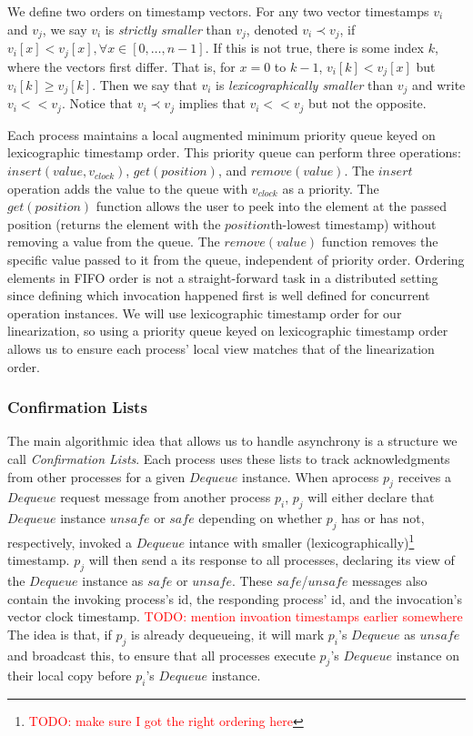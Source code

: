 \documentclass[a4paper,USenglish]{lipics-v2021} %
\begin{document}
We define two orders on timestamp vectors.  For any two vector timestamps $v_i$ and $v_j$, we say $v_i$ is \emph{strictly smaller} than $v_j$, denoted $v_i \prec  v_j$, if $v_i[x] < v_j[x],\forall x \in [0, \dots, n-1]$.  If this is not true, there is some index $k$, where the vectors first differ.  That is, for $x = 0$ to $k-1$, $v_i[k] < v_j[x]$ but $v_i[k] \geq v_j [k]$.  Then we say that $v_i$ is \emph{lexicographically smaller} than $v_j$ and write $v_i << v_j$.  Notice that $v_i \prec v_j$ implies that $v_i << v_j$ but not the opposite.

Each process maintains a local augmented minimum priority queue keyed on lexicographic timestamp order.  This priority queue can perform three operations: $insert(value, v_{clock})$, $get(position)$, and $remove(value)$.  The $insert$ operation adds the value to the queue with $v_{clock}$ as a priority.  The $get(position)$ function allows the user to peek into the element at the passed position (returns the element with the $position$th-lowest timestamp) without removing a value from the queue.  The $remove(value)$ function removes the specific value passed to it from the queue, independent of priority order.  Ordering elements in FIFO order is not a straight-forward task in a distributed setting since defining which invocation happened first is well defined for concurrent operation instances.  We will use lexicographic timestamp order for our linearization, so using a priority queue keyed on lexicographic timestamp order allows us to ensure each process' local view matches that of the linearization order.

\subsubsection{Confirmation Lists}
The main algorithmic idea that allows us to handle asynchrony is a structure we call \emph{Confirmation Lists}.  Each process uses these lists to track acknowledgments from other processes for a given $Dequeue$ instance.  When aprocess $p_j$ receives a $Dequeue$ request message from another process $p_i$, $p_j$ will either declare that $Dequeue$ instance $unsafe$ or $safe$ depending on whether $p_j$ has or has not, respectively, invoked a $Dequeue$ intance with smaller (lexicographically)\footnote{\textcolor{red}{TODO: make sure I got the right ordering here}} timestamp.  $p_j$ will then send a its response to all processes, declaring its view of the $Dequeue$ instance as $safe$ or $unsafe$. These $safe$/$unsafe$ messages also contain the invoking process's id, the responding process' id, and the invocation's vector clock timestamp.  \textcolor{red}{TODO: mention invoation timestamps earlier somewhere}  The idea is that, if $p_j$ is already dequeueing, it will mark $p_i$'s $Dequeue$ as $unsafe$ and broadcast this, to ensure that all processes execute $p_j$'s $Dequeue$ instance on their local copy before $p_i$'s $Dequeue$ instance.
\end{document}

